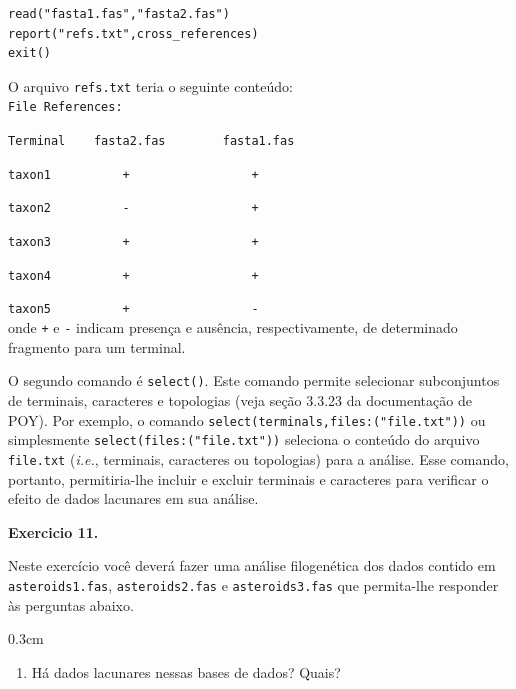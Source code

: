 \begin{refsection}
\begin{lstlisting}[caption= Exemplo de \textit{script} para implementar \texttt{cross\_references}.,label=tut11:missing:script1]
read("fasta1.fas","fasta2.fas")
report("refs.txt",cross_references)
exit()
\end{lstlisting}

O arquivo \texttt{refs.txt} teria o seguinte conteúdo:\\


\texttt{File~References:}

\texttt{Terminal~~~~fasta2.fas~~~~~~~~fasta1.fas}

\texttt{taxon1~~~~~~~~~~+~~~~~~~~~~~~~~~~~+}

\texttt{taxon2~~~~~~~~~~-~~~~~~~~~~~~~~~~~+}

\texttt{taxon3~~~~~~~~~~+~~~~~~~~~~~~~~~~~+}

\texttt{taxon4~~~~~~~~~~+~~~~~~~~~~~~~~~~~+}

\texttt{taxon5~~~~~~~~~~+~~~~~~~~~~~~~~~~~-}\\


onde \texttt{+} e \texttt{-} indicam presença e ausência, respectivamente, de determinado fragmento para um terminal.

O segundo comando é \texttt{select()}. Este comando permite selecionar subconjuntos de terminais, caracteres e topologias (veja seção 3.3.23 da documentação de POY). Por exemplo, o comando \texttt{select(terminals,files:("file.txt"))} ou simplesmente \texttt{select(files:("file.txt"))} seleciona o conteúdo do arquivo \texttt{file.txt} (\textit{i.e.}, terminais, caracteres ou topologias) para a análise. Esse comando, portanto, permitiria-lhe incluir e excluir terminais e caracteres para verificar o efeito de dados lacunares em sua análise.\\

\begin{blackBlock}{\textbf{Exercicio 11.}}\label{tut11:ex:11.4}

Neste exercício você deverá fazer uma análise filogenética dos dados contido em \texttt{asteroids1.fas}, \texttt{asteroids2.fas} e \texttt{asteroids3.fas} que permita-lhe responder às perguntas abaixo.

\end{blackBlock}

\begin {myindentpar}{0.3cm}
\begin{enumerate}[\itshape i.]

	\item{Há dados lacunares nessas bases de dados? Quais?}


\end{enumerate}
\end{myindentpar}
\end{refsection}
